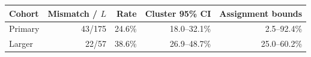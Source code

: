 \begin{tabular}{@{}lrrrr@{}}\toprule
Cohort & Mismatch / $L$ & Rate & Cluster 95\% CI & Assignment bounds\\\midrule
Primary & 43/175 & 24.6\% & 18.0--32.1\% & 2.5--92.4\%\\
Larger & 22/57 & 38.6\% & 26.9--48.7\% & 25.0--60.2\%\\
\bottomrule
\end{tabular}
